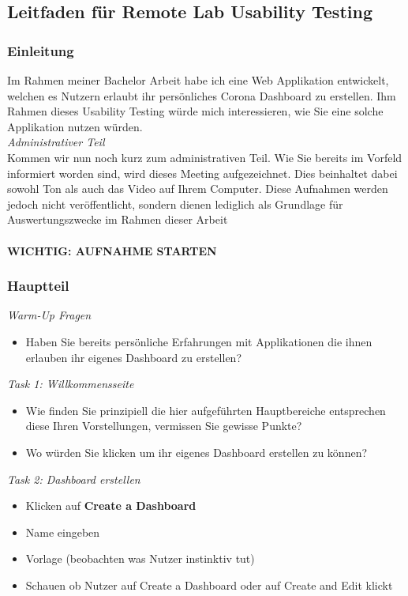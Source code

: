 \documentclass[12pt, oneside]{article}
\begin{document}
\subsection*{Leitfaden für Remote Lab Usability Testing}

\subsubsection*{Einleitung}
Im Rahmen meiner Bachelor Arbeit habe ich eine Web Applikation entwickelt, welchen es Nutzern erlaubt ihr persönliches Corona Dashboard zu erstellen. Ihm Rahmen dieses Usability Testing würde mich interessieren, wie Sie eine solche Applikation nutzen würden.
\\

\textit{Administrativer Teil}
\\
Kommen wir nun noch kurz zum administrativen Teil. Wie Sie bereits im Vorfeld informiert worden sind, wird dieses Meeting aufgezeichnet. Dies beinhaltet dabei sowohl Ton als auch das Video auf Ihrem Computer. Diese Aufnahmen werden jedoch nicht veröffentlicht, sondern dienen lediglich als Grundlage für Auswertungszwecke im Rahmen dieser Arbeit\\\\
\textbf{WICHTIG: AUFNAHME STARTEN}


\clearpage
\subsubsection*{Hauptteil}

\textit{Warm-Up Fragen}
\begin{itemize}
    \item Haben Sie bereits persönliche Erfahrungen mit Applikationen die ihnen erlauben ihr eigenes Dashboard zu erstellen?
\end{itemize}

\textit{Task 1: Willkommensseite}
\begin{itemize}
    \item Wie finden Sie prinzipiell die hier aufgeführten Hauptbereiche entsprechen diese Ihren Vorstellungen, vermissen Sie gewisse Punkte?
    \item Wo würden Sie klicken um ihr eigenes Dashboard erstellen zu können?
\end{itemize}

\textit{Task 2: Dashboard erstellen}
\begin{itemize}
    \item Klicken auf \textbf{Create a Dashboard}
    \item Name eingeben
    \item Vorlage (beobachten was Nutzer instinktiv tut)
    \item Schauen ob Nutzer auf Create a Dashboard oder auf Create and Edit klickt
\end{itemize}
\end{document}
